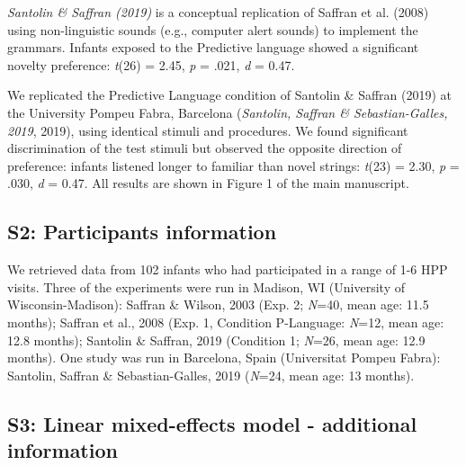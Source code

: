 \documentclass[english,man,man,floatsintext]{apa6}
\begin{document}
\begin{appendix}
\emph{Santolin \& Saffran (2019)} is a conceptual replication of Saffran
et al. (2008) using non-linguistic sounds (e.g., computer alert sounds)
to implement the grammars. Infants exposed to the Predictive language
showed a significant novelty preference: \emph{t}(26) = 2.45, \emph{p} =
.021, \emph{d} = 0.47.

We replicated the Predictive Language condition of Santolin \& Saffran
(2019) at the University Pompeu Fabra, Barcelona (\emph{Santolin,
Saffran \& Sebastian-Galles, 2019}, 2019), using identical stimuli and
procedures. We found significant discrimination of the test stimuli but
observed the opposite direction of preference: infants listened longer
to familiar than novel strings: \emph{t}(23) = 2.30, \emph{p} = .030,
\emph{d} = 0.47. All results are shown in Figure 1 of the main
manuscript.

\hypertarget{s2}{%
\subsection{S2: Participants information}\label{s2}}

We retrieved data from 102 infants who had participated in a range of
1-6 HPP visits. Three of the experiments were run in Madison, WI
(University of Wisconsin-Madison): Saffran \& Wilson, 2003 (Exp. 2;
\emph{N}=40, mean age: 11.5 months); Saffran et al., 2008 (Exp. 1,
Condition P-Language: \emph{N}=12, mean age: 12.8 months); Santolin \&
Saffran, 2019 (Condition 1; \emph{N}=26, mean age: 12.9 months). One
study was run in Barcelona, Spain (Universitat Pompeu Fabra): Santolin,
Saffran \& Sebastian-Galles, 2019 (\emph{N}=24, mean age: 13 months).

\hypertarget{s3}{%
\subsection{S3: Linear mixed-effects model - additional
information}\label{s3}}


\end{appendix}
\end{document}
